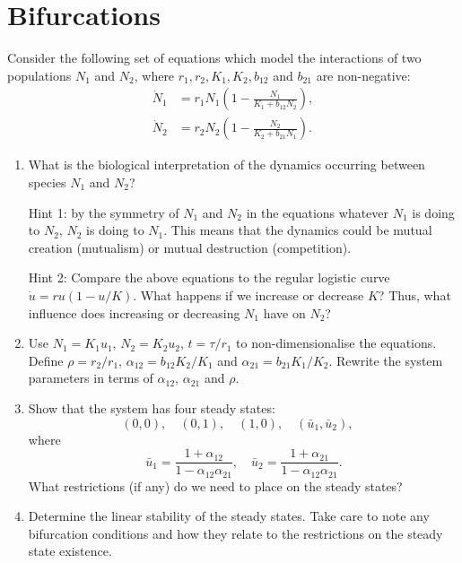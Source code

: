 \documentclass[]{article}
\newcommand{\bb}{\begin{equation}}
\newcommand{\ee}{\end{equation}}
\renewcommand{\l}{\left(}
\renewcommand{\r}{\right)}
\begin{document}
\section{Bifurcations}
Consider the following set of equations which model the interactions of two populations $N_1$ and $N_2$, where $r_1, r_2, K_1, K_2, b_{12}$ and $b_{21}$ are non-negative:
\begin{align}
\dot{N}_1&=r_1N_1\l 1-\frac{N_1}{K_1+b_{12}N_2}\r,\\
\dot{N}_2&=r_2N_2\l 1-\frac{N_2}{K_2+b_{21}N_1}\r.
\end{align}
\begin{enumerate}
\item What is the biological interpretation of the dynamics occurring between species $N_1$ and $N_2$?

Hint 1: by the symmetry of $N_1$ and $N_2$ in the equations whatever $N_1$ is doing to $N_2$, $N_2$ is doing to $N_1$. This means that the dynamics could be mutual creation (mutualism) or mutual destruction (competition).

Hint 2: Compare the above equations to the regular logistic curve $\dot{u}=ru(1-u/K)$. What happens if we increase or decrease $K$? Thus, what influence does increasing or decreasing $N_1$ have on $N_2$?

\item Use $N_1=K_1u_1$, $N_2=K_2u_2$, $t=\tau/r_1$ to non-dimensionalise the equations. Define $\rho=r_2/r_1$, $\alpha_{12}=b_{12}K_2/K_1$ and $\alpha_{21}=b_{21}K_1/K_2$. Rewrite the system parameters in terms of $\alpha_{12}$, $\alpha_{21}$ and $\rho$.

\item Show that the system has four steady states:
\bb
(0,0), \quad (0,1), \quad (1,0), \quad (\bar{u}_1,\bar{u}_2), \quad
\ee
where
\bb
\bar{u}_1=\frac{1+\alpha_{12}}{1-\alpha_{12}\alpha_{21}},\quad\bar{u}_2=\frac{1+\alpha_{21}}{1-\alpha_{12}\alpha_{21}}.
\ee
What restrictions (if any) do we need to place on the steady states?
\item Determine the linear stability of the steady states. Take care to note any bifurcation conditions and how they relate to the restrictions on the steady state existence.
\end{enumerate}
\end{document}
